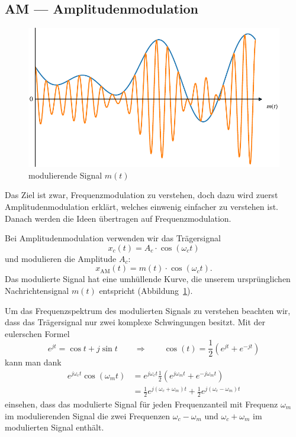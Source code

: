%
%
%
\subsection{AM --- Amplitudenmodulation\label{fm:section:teil0}}
\begin{figure}
	\centering
	\includegraphics{papers/fm/images/amnormal.pdf}
	\caption{modulierende Signal \(m(t)\)}
	\label{fig:modulierend}
\end{figure}
Das Ziel ist zwar, Frequenzmodulation zu verstehen, doch dazu wird
zuerst Amplitudenmodulation erklärt, welches einwenig einfacher zu
verstehen ist.
Danach werden die Ideen übertragen auf Frequenzmodulation.

Bei Amplitudenmodulation verwenden wir das Trägersignal
\[
    x_c(t) = A_c \cdot \cos(\omega_ct)
\]
und modulieren die Amplitude \(A_c\):
\[
    x_{\text{AM}}(t) = m(t) \cdot \cos(\omega_ct).
\]
Das modulierte Signal hat eine umhüllende Kurve, die unserem
ursprünglichen Nachrichtensignal \(m(t)\) entspricht
(Abbildung~\ref{fig:modulierend}).

Um das Frequenzspektrum des modulierten Signals zu verstehen
beachten wir, dass das Trägersignal nur zwei komplexe Schwingungen
besitzt. 
Mit der eulerschen Formel
\begin{equation}
e^{jt}
=
\cos t+j\sin t
\qquad\Rightarrow\qquad
\cos(t) = \frac12 (e^{jt} + e^{-jt})
\label{fm:eq:AM:euler}
\end{equation}
kann man dank
\begin{align*}
e^{j\omega_c t} \cos(\omega_m t)
&=
e^{j\omega_c t}\frac12(e^{j\omega_m t} + e^{-j\omega_m t})
\\
&=
\frac12
e^{j(\omega_c+\omega_m) t}
+
\frac12
e^{j(\omega_c-\omega_m) t}
\end{align*}
einsehen, dass das modulierte Signal für jeden Frequenzanteil
mit Frequenz $\omega_m$ im modulierenden Signal
die zwei Frequenzen $\omega_c-\omega_m$ und
$\omega_c+\omega_m$ im modulierten Signal enthält.


